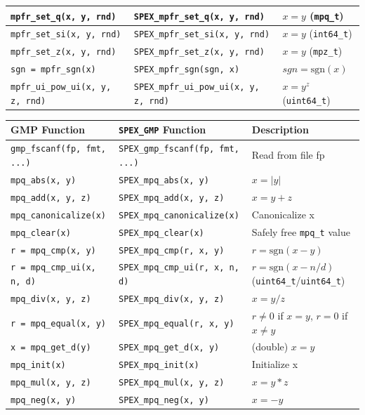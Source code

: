\documentclass[12pt,oneside]{book}
\theoremstyle{definition}
\newenvironment{SizedCenteredTabular}[2][\small]
    {   
        #1\begin{center}\begin{tabular}{#2}
    }{ 
        \end{tabular}\end{center}
    }
\begin{document}
\begin{SizedCenteredTabular}[\scriptsize]{|l|l|p{1.7in}|}
\verb|mpfr_set_q(x, y, rnd)|& \verb|SPEX_mpfr_set_q(x, y, rnd)|& $x = y$ (\verb|mpq_t|) \\ \hline
\verb|mpfr_set_si(x, y, rnd)|& \verb|SPEX_mpfr_set_si(x, y, rnd)|& $x = y$ (\verb|int64_t|) \\ \hline
\verb|mpfr_set_z(x, y, rnd)|& \verb|SPEX_mpfr_set_z(x, y, rnd)|& $x = y$ (\verb|mpz_t|) \\ \hline
\verb|sgn = mpfr_sgn(x)|& \verb|SPEX_mpfr_sgn(sgn, x)|& $sgn =\text{sgn}(x)$ \\ \hline
\verb|mpfr_ui_pow_ui(x, y, z, rnd)|& \verb|SPEX_mpfr_ui_pow_ui(x, y, z, rnd)|& $x = y^z$ (\verb|uint64_t|) \\ \hline
\end{SizedCenteredTabular}

\begin{SizedCenteredTabular}[\scriptsize]{|l|l|p{2in}|} \hline
{\bf GMP Function} & \verb|SPEX_GMP| {\bf Function} & {\bf Description} \\ \hline\hline
\verb|gmp_fscanf(fp, fmt, ...)|& \verb|SPEX_gmp_fscanf(fp, fmt, ...)|& Read from file fp \\ \hline \hline
\verb|mpq_abs(x, y)|& \verb|SPEX_mpq_abs(x, y)|& $x = |y|$ \\ \hline
\verb|mpq_add(x, y, z)|& \verb|SPEX_mpq_add(x, y, z)|& $x = y+z$ \\ \hline
\verb|mpq_canonicalize(x)|    & \verb|SPEX_mpq_canonicalize(x)|   & Canonicalize x \\ \hline
\verb|mpq_clear(x)|& \verb|SPEX_mpq_clear(x)|& Safely free \verb|mpq_t| value \\ \hline
\verb|r = mpq_cmp(x, y)|& \verb|SPEX_mpq_cmp(r, x, y)|& $r = \text{sgn}(x-y)$ \\ \hline
\verb|r = mpq_cmp_ui(x, n, d)|& \verb|SPEX_mpq_cmp_ui(r, x, n, d)|& $r = \text{sgn}(x-n/d)$ (\verb|uint64_t|/\verb|uint64_t|)  \\ \hline
\verb|mpq_div(x, y, z)|& \verb|SPEX_mpq_div(x, y, z)|& $x = y/z$ \\ \hline
\verb|r = mpq_equal(x, y)|& \verb|SPEX_mpq_equal(r, x, y)|& $r \neq 0$ if $x=y$,  $r= 0$ if $x\neq y$ \\ \hline
\verb|x = mpq_get_d(y)|& \verb|SPEX_mpq_get_d(x, y)|& (double) $x = y$ \\ \hline
\verb|mpq_init(x)|& \verb|SPEX_mpq_init(x)|& Initialize x \\ \hline
\verb|mpq_mul(x, y, z)|& \verb|SPEX_mpq_mul(x, y, z)|& $x = y*z$ \\ \hline
\verb|mpq_neg(x, y)|& \verb|SPEX_mpq_neg(x, y)|& $x = -y$ \\ \hline

\end{SizedCenteredTabular}
\end{document}
